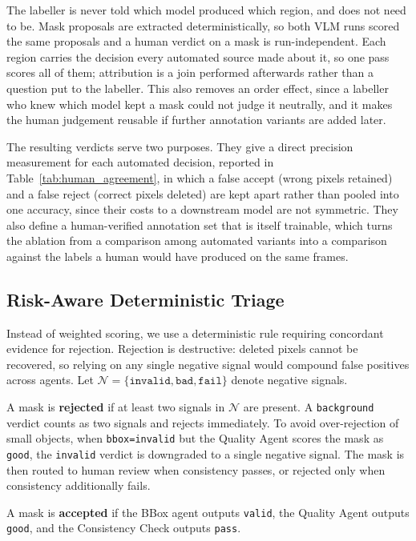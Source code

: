 \documentclass[conference]{IEEEtran}
\begin{document}
The labeller is never told which model produced which region, and does not need to be.
Mask proposals are extracted deterministically, so both VLM runs scored the same proposals and a
human verdict on a mask is run-independent. Each region carries the decision every automated source made
about it, so one pass scores all of them; attribution is a join performed afterwards rather than a
question put to the labeller. This also removes an order effect, since a labeller who knew which model
kept a mask could not judge it neutrally, and it makes the human judgement reusable if further annotation
variants are added later.

The resulting verdicts serve two purposes. They give a direct precision measurement for each automated
decision, reported in Table~\ref{tab:human_agreement}, in which a false accept (wrong pixels retained)
and a false reject (correct pixels deleted) are kept apart rather than pooled into one accuracy, since
their costs to a downstream model are not symmetric. They also define a human-verified annotation set that
is itself trainable, which turns the ablation from a comparison among automated variants into a
comparison against the labels a human would have produced on the same frames.

\subsection{Risk-Aware Deterministic Triage}

Instead of weighted scoring, we use a deterministic rule requiring concordant evidence for rejection. 
Rejection is destructive: deleted pixels cannot be recovered, so relying on any single negative signal would compound false positives across agents. 
Let $\mathcal{N}=\{\texttt{invalid},\texttt{bad},\texttt{fail}\}$ denote negative signals.

A mask is \textbf{rejected} if at least two signals in $\mathcal{N}$ are present. 
A \texttt{background} verdict counts as two signals and rejects immediately. 
To avoid over-rejection of small objects, when \texttt{bbox=invalid} but the Quality Agent scores the mask as \texttt{good}, the \texttt{invalid} verdict is downgraded to a single negative signal. 
The mask is then routed to human review when consistency passes, or rejected only when consistency additionally fails.

A mask is \textbf{accepted} if the BBox agent outputs \texttt{valid}, the Quality Agent outputs \texttt{good}, and the Consistency Check outputs \texttt{pass}.
\end{document}
